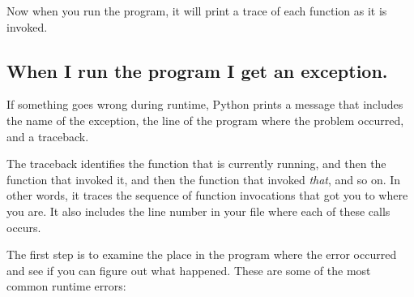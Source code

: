 \documentclass[10pt]{book}
\begin{document}
Now when you run the program, it will print a trace of each
function as it is invoked.


\subsection{When I run the program I get an exception.}

If something goes wrong during runtime, Python
prints a message that includes the name of the
exception, the line of the program where the problem occurred,
and a traceback.

The traceback identifies the function that is currently running,
and then the function that invoked it, and then the function that
invoked {\em that}, and so on.  In other words, it traces the
sequence of function invocations that got you to where you are.  It
also includes the line number in your file where each of these
calls occurs.

The first step is to examine the place in the program where
the error occurred and see if you can figure out what happened.
These are some of the most common runtime errors:
\end{document}
